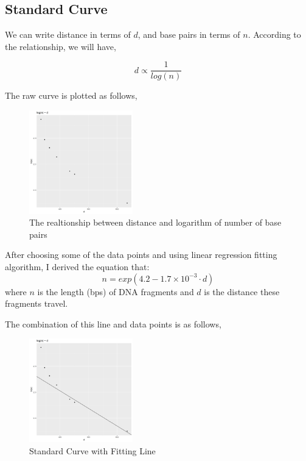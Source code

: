 \documentclass{article}
\begin{document}
        \subsection{Standard Curve}

            We can write distance in terms of $d$, and base pairs in terms of $n$. According to the relationship, we will have,

            $$d \propto \frac{1}{log(n)}$$

            The raw curve is plotted as follows,
            \begin{figure}[H]
                \centering
                \includegraphics[width = 0.4\textwidth]{../Data/raw_point.png}
                \caption{The realtionship between distance and logarithm of number of base pairs}
                \label{raw.curve}
            \end{figure}

            After choosing some of the data points and using linear regression fitting algorithm, I derived the equation that:
            $$n = exp(4.2 - 1.7 \times 10 ^ {-3} \cdot d)$$
            where $n$ is the length (bps) of DNA fragments and $d$ is the distance these fragments travel.

            The combination of this line and data points is as follows,
            \begin{figure}[H]
                \centering
                \includegraphics[width = 0.4\textwidth]{../Data/raw_points_line.png}
                \caption{Standard Curve with Fitting Line}
                \label{raw.curve.line}
            \end{figure}
            
\end{document}
